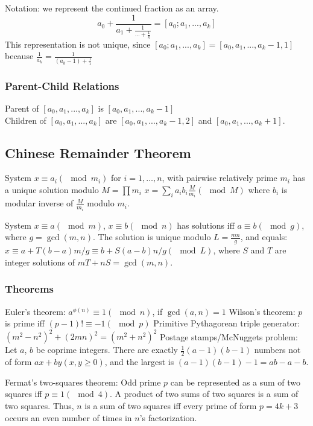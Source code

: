 Notation: we represent the continued fraction as an array.
\begin{equation*}
  a_0 + \frac{1}{a_1 + \frac{1}{... + \frac{1}{k}}} = [a_0; a_1, ..., a_k]
\end{equation*}
This representation is not unique, since
$[a_0; a_1, ..., a_k] = [a_0, a_1, ..., a_k - 1, 1]$ because $\frac{1}{a_k} = \frac{1}{(a_k-1) + \frac{1}{1}}$

\subsubsection{Parent-Child Relations}
Parent of $ [a_0, a_1, ..., a_k] $ is $ [a_0, a_1, ..., a_k-1] $ \\
Children of $[a_0, a_1, ..., a_k]$ are $[a_0, a_1, ..., a_k-1, 2]$ and $[a_0, a_1, ..., a_k+1]$.


\subsection{Chinese Remainder Theorem}

System $x \equiv a_i(\mod m_i)$ for $i = 1, \ldots, n$, with pairwise relatively prime $m_i$ has a unique solution modulo $M = \prod m_i$
$x=\sum_{i} a_ib_i\frac M{m_i} (\mod M)$ where $b_i$ is modular inverse of $\frac M{m_i}$ modulo $m_i$.

System $x \equiv a (\mod m)$, $x \equiv b (\mod n)$ has solutions iff $a \equiv b (\mod g)$, where $g = \gcd(m, n)$. The
solution is unique modulo $L = \frac{mn}{g}$, and equals: $x \equiv a + T (b − a)m/g \equiv b + S(a − b)n/g (\mod L)$,
where $S$ and $T$ are integer solutions of $mT + nS = \gcd(m, n)$.


\subsubsection{Theorems}

Euler's theorem: $a^{\phi(n)}\equiv 1(\mod n)$, if $\gcd(a,n)=1$
Wilson's theorem: $p$ is prime iff $(p-1)! \equiv -1(\mod p)$
Primitive Pythagorean triple generator: $(m^2-n^2)^2 + (2mn)^2 = (m^2+n^2)^2$
Postage stamps/McNuggets problem: Let $a$, $b$ be coprime integers. There are exactly $\frac 12(a−1)(b−1)$ numbers not of form $ax+by (x, y \geq 0)$, and the largest is $(a−1)(b−1)−1 = ab−a−b$.

Fermat’s two-squares theorem: Odd prime $p$ can be represented as a sum of two squares iff
$p \equiv 1 (\mod 4)$. A product of two sums of two squares is a sum of two squares. Thus, $n$ is a sum of
two squares iff every prime of form $p = 4k + 3$ occurs an even number of times in $n$’s factorization.

